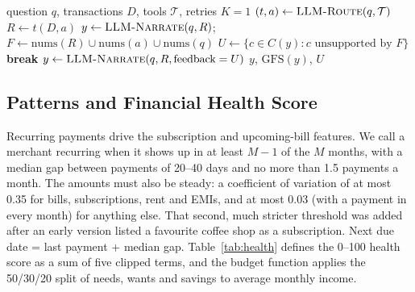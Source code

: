 \documentclass[conference]{IEEEtran}
\begin{document}
\begin{algorithm}[t]
\caption{Grounded Explain-then-Verify}\label{alg:gev}
\begin{algorithmic}[1]
\Require question $q$, transactions $D$, tools $\mathcal{T}$, retries $K{=}1$
\State $(t,a) \gets \textsc{LLM-Route}(q,\mathcal{T})$ 
\State $R \gets t(D,a)$ 
\State $y \gets \textsc{LLM-Narrate}(q,R)$; \ $F \gets \mathrm{nums}(R)\cup\mathrm{nums}(a)\cup\mathrm{nums}(q)$
  \State $U \gets \{c\in C(y): c \text{ unsupported by } F\}$
   \textbf{break} \EndIf
  \State $y \gets \textsc{LLM-Narrate}(q,R,\text{feedback}=U)$
\EndFor
\State \Return $y$, $\mathrm{GFS}(y)$, $U$ 
\end{algorithmic}
\end{algorithm}

\subsection{Patterns and Financial Health Score}
Recurring payments drive the subscription and upcoming-bill features. We call a merchant recurring when it shows up in at least $M-1$ of the $M$ months, with a median gap between payments of 20--40 days and no more than 1.5 payments a month. The amounts must also be steady: a coefficient of variation of at most 0.35 for bills, subscriptions, rent and EMIs, and at most 0.03 (with a payment in every month) for anything else. That second, much stricter threshold was added after an early version listed a favourite coffee shop as a subscription. Next due date = last payment + median gap. Table~\ref{tab:health} defines the 0--100 health score as a sum of five clipped terms, and the budget function applies the 50/30/20 split of needs, wants and savings \cite{warren2005} to average monthly income.

\begin{table}[t]
\caption{Financial health score components (total 100)}
\label{tab:health}
\centering
{}
\end{table}
\end{document}
